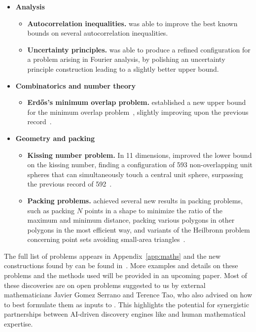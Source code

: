 \begin{itemize}
    \item \textbf{Analysis} 
    \begin{itemize}
        \item \textbf{Autocorrelation inequalities.} \method was able to improve the best known bounds on several autocorrelation inequalities.
        \item \textbf{Uncertainty principles.} \method was able to produce a refined configuration for a problem arising in Fourier analysis, by polishing an uncertainty principle construction \cite{gonccalves2017hermite} leading to a slightly better upper bound. 
    \end{itemize}

    \item \textbf{Combinatorics and number theory}
        \begin{itemize}
            \item \textbf{Erd\H{o}s's minimum overlap problem.} \method established a new upper bound for the minimum overlap problem~\cite{erdHos1955some}, slightly improving upon the previous record~\cite{haugland2016minimum}.
        \end{itemize}

    \item \textbf{Geometry and packing}
        \begin{itemize}
            \item \textbf{Kissing number problem.} In 11 dimensions, \method improved the lower bound on the kissing number, finding a configuration of 593 non-overlapping unit spheres that can simultaneously touch a central unit sphere, surpassing the previous record of 592~\citep{kissing_11}. 
            \item \textbf{Packing problems.} \method achieved several new results in packing problems, such as packing $N$ points in a shape to minimize the ratio of the maximum and minimum distance, packing various polygons in other polygons in the most efficient way, and variants of the Heilbronn problem concerning point sets avoiding small-area triangles~\cite{geometry_collection}.
        \end{itemize}
\end{itemize}

The full list of problems appears in Appendix~\ref{app:maths} and the new constructions found by \method can be found in~\ResultsColab.
More examples and details on these problems and the methods used will be provided in an upcoming paper.
Most of these discoveries are on open problems suggested to us by external mathematicians Javier Gomez Serrano and Terence Tao, who also advised on how to best formulate them as inputs to \method.
This highlights the potential for synergistic partnerships between AI-driven discovery engines like \method and human mathematical expertise.


